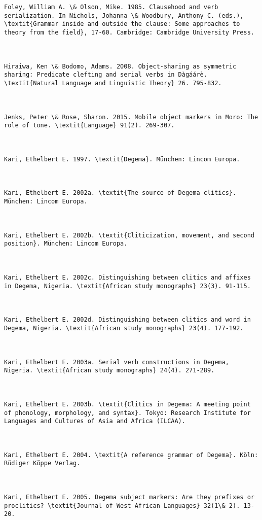 \documentclass[output=paper]{langsci/langscibook}
\begin{document}
\begin{verbatim}
Foley, William A. \& Olson, Mike. 1985. Clausehood and verb serialization. In Nichols, Johanna \& Woodbury, Anthony C. (eds.), \textit{Grammar inside and outside the clause: Some approaches to theory from the field}, 17-60. Cambridge: Cambridge University Press. 



Hiraiwa, Ken \& Bodomo, Adams. 2008. Object-sharing as symmetric sharing: Predicate clefting and serial verbs in Dàgáárè. \textit{Natural Language and Linguistic Theory} 26. 795-832.



Jenks, Peter \& Rose, Sharon. 2015. Mobile object markers in Moro: The role of tone. \textit{Language} 91(2). 269-307.



Kari, Ethelbert E. 1997. \textit{Degema}. München: Lincom Europa.



Kari, Ethelbert E. 2002a. \textit{The source of Degema clitics}. München: Lincom Europa.



Kari, Ethelbert E. 2002b. \textit{Cliticization, movement, and second position}. München: Lincom Europa. 



Kari, Ethelbert E. 2002c. Distinguishing between clitics and affixes in Degema, Nigeria. \textit{African study monographs} 23(3). 91-115. 



Kari, Ethelbert E. 2002d. Distinguishing between clitics and word in Degema, Nigeria. \textit{African study monographs} 23(4). 177-192.



Kari, Ethelbert E. 2003a. Serial verb constructions in Degema, Nigeria. \textit{African study monographs} 24(4). 271-289.



Kari, Ethelbert E. 2003b. \textit{Clitics in Degema: A meeting point of phonology, morphology, and syntax}. Tokyo: Research Institute for Languages and Cultures of Asia and Africa (ILCAA).



Kari, Ethelbert E. 2004. \textit{A reference grammar of Degema}. Köln: Rüdiger Köppe Verlag.



Kari, Ethelbert E. 2005. Degema subject markers: Are they prefixes or proclitics? \textit{Journal of West African Languages} 32(1\& 2). 13-20.




\end{verbatim}
\end{document}
